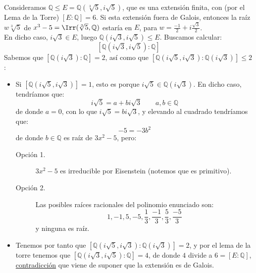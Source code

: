 \begin{ejemplo}
    Consideramos $\mathbb{Q}\leq E=\mathbb{Q}\left(\sqrt[3]{5},i\sqrt{5}\right)$, que es una extensión finita, con (por el Lema de la Torre) $[E:\mathbb{Q}] = 6$. Si esta extensión fuera de Galois, entonces la raíz $w\sqrt[3]{5}$ de $x^3-5=\Irr(\sqrt[3]{5},\mathbb{Q})$ estaría en $E$, para $w = \frac{-1}{2} + i\frac{\sqrt{3}}{2}$.\\

    \noindent
    En dicho caso, $i\sqrt{3}\in E$, luego $\mathbb{Q}\left(i\sqrt{3},i\sqrt{5}\right)\leq E$. Buscamos calcular:
    \begin{equation*}
        \left[\mathbb{Q}\left(i\sqrt{3},i\sqrt{5}\right):\mathbb{Q}\right]
    \end{equation*}
    Sabemos que $\left[\mathbb{Q}\left(i\sqrt{3}\right):\mathbb{Q}\right] = 2$, así como que $\left[\mathbb{Q}\left(i\sqrt{5},i\sqrt{3}\right):\mathbb{Q}\left(i\sqrt{3}\right)\right]\leq 2$:
    \begin{itemize}
        \item Si $\left[\mathbb{Q}\left(i\sqrt{5},i\sqrt{3}\right)\right]=1$, esto es porque $i\sqrt{5}\in \mathbb{Q}\left(i\sqrt{3}\right)$. En dicho caso, tendríamos que:
            \begin{equation*}
                i\sqrt{5} = a+bi\sqrt{3} \qquad a,b\in \mathbb{Q}
            \end{equation*}
            de donde $a=0$, con lo que $i\sqrt{5}=bi\sqrt{3}$, y elevando al cuadrado tendríamos que:
            \begin{equation*}
                -5 = -3b^2
            \end{equation*}
            de donde $b\in \mathbb{Q}$ es raíz de $3x^2-5$, pero:
            \begin{description}
                \item [Opción 1.] $3x^2-5$ es irreducible por Eisenstein (notemos que es primitivo).
                \item [Opción 2.] Las posibles raíces racionales del polinomio enunciado son:
                    \begin{equation*}
                        1, -1, 5, -5, \frac{1}{3}, \frac{-1}{3}, \frac{5}{3}, \frac{-5}{3}
                    \end{equation*}
                    y ninguna es raíz.
            \end{description}
        \item Tenemos por tanto que $\left[\mathbb{Q}\left(i\sqrt{5},i\sqrt{3}\right):\mathbb{Q}\left(i\sqrt{3}\right)\right] = 2$, y por el lema de la torre tenemos que $\left[\mathbb{Q}\left(i\sqrt{3},i\sqrt{5}\right):\mathbb{Q}\right] =4$, de donde $4$ divide a $6 = [E:\mathbb{Q}]$, \underline{contradicción} que viene de suponer que la extensión es de Galois.
    \end{itemize}
\end{ejemplo}

